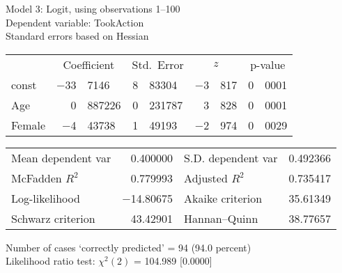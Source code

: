 \documentclass[11pt]{article}
\begin{document}
\thispagestyle{empty}

\begin{center}

Model 3: Logit, using observations 1--100\\
Dependent variable: TookAction\\
Standard errors based on Hessian

\vspace{1em}

\begin{tabular}{lr@{.}lr@{.}lr@{.}lr@{.}l}
  &
 \multicolumn{2}{c}{Coefficient} &
  \multicolumn{2}{c}{Std.\ Error} &
   \multicolumn{2}{c}{$z$} &
    \multicolumn{2}{c}{p-value} \\[1ex]
const &
  $-$33&7146 &
    8&83304 &
      $-$3&817 &
        0&0001 \\
Age &
  0&887226 &
    0&231787 &
      3&828 &
        0&0001 \\
Female &
  $-$4&43738 &
    1&49193 &
      $-$2&974 &
        0&0029 \\
\end{tabular}

\vspace{1ex}
\begin{tabular}{lrlr}
Mean dependent var &  0.400000 & S.D. dependent var &  0.492366 \\
McFadden $R^2$ &  0.779993 & Adjusted $R^2$ &  0.735417 \\
Log-likelihood & $-$14.80675 & Akaike criterion &  35.61349 \\
Schwarz criterion &  43.42901 & Hannan--Quinn &  38.77657 \\
\end{tabular}


\vspace{1ex}
\vspace{1em}
\begin{raggedright}
Number of cases `correctly predicted' = 94 (94.0 percent)\\
Likelihood ratio test: $\chi^2(2)$ = 104.989 [0.0000]\\
\end{raggedright}

\end{center}
\end{document}
